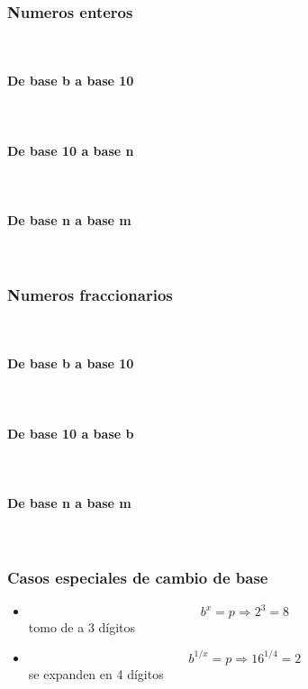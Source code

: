 \subsubsection{Numeros enteros}\mbox{}\\

\paragraph{De base b a base 10}\mbox{}\\
\paragraph{De base 10 a base n}\mbox{}\\
\paragraph{De base n a base m}\mbox{}\\

\subsubsection{Numeros fraccionarios}\mbox{}\\

\paragraph{De base b a base 10}\mbox{}\\
\paragraph{De base 10 a base b}\mbox{}\\
\paragraph{De base n a base m}\mbox{}\\

\subsubsection{Casos especiales de cambio de base}
\begin{itemize}
	\item \[ b^x  = p \Rightarrow 2^3 = 8 \] tomo de a 3 dígitos
	\item \[ b^{1/x}  = p \Rightarrow 16^{1/4} = 2 \]  se expanden en 4 dígitos
\end{itemize}

